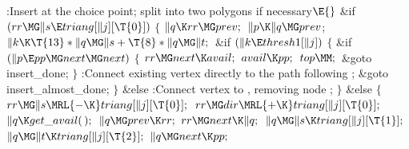 \Y\B\4:Insert  at the choice point; split into two polygons if
necessary\X${}\E{}$\6
\&{if} ${}(\\{rr}\MG\|s\E\\{triang}[\|j][\T{0}]){}$\5
${}\{{}$\1\6
${}\|q\K\\{rr}\MG\\{prev};{}$\6
${}\|p\K\|q\MG\\{prev}{}$;\6
${}\|k\K\T{13}*\|q\MG\|s+\T{8}*\|q\MG\|t;{}$\6
\&{if} ${}(\|k\E\\{thresh1}[\|j]){}$\5
${}\{{}$\1\6
\&{if} ${}(\|p\E\\{pp}\MG\\{next}\MG\\{next}){}$\5
${}\{{}$\1\6
${}\\{rr}\MG\\{next}\K\\{avail};{}$\6
${}\\{avail}\K\\{pp};{}$\6
${}\\{top}\MM;{}$\6
\&{goto} \\{insert\_done};\6
\4${}\}{}$\2\6
:Connect existing vertex  directly to the path following %
\X;\6
\&{goto} \\{insert\_almost\_done};\6
\4${}\}{}$\2\6
\&{else}\1\5
:Connect vertex  to , removing node \X;\2\6
\4${}\}{}$\2\6
\&{else}\5
${}\{{}$\1\6
${}\\{rr}\MG\|s\MRL{-{\K}}\\{triang}[\|j][\T{0}];{}$\6
${}\\{rr}\MG\\{dir}\MRL{+{\K}}\\{triang}[\|j][\T{0}];{}$\6
${}\|q\K\\{get\_avail}(\,);{}$\6
${}\|q\MG\\{prev}\K\\{rr};{}$\6
${}\\{rr}\MG\\{next}\K\|q;{}$\6
${}\|q\MG\|s\K\\{triang}[\|j][\T{1}];{}$\6
${}\|q\MG\|t\K\\{triang}[\|j][\T{2}];{}$\6
${}\|q\MG\\{next}\K\\{pp};{}$\6
